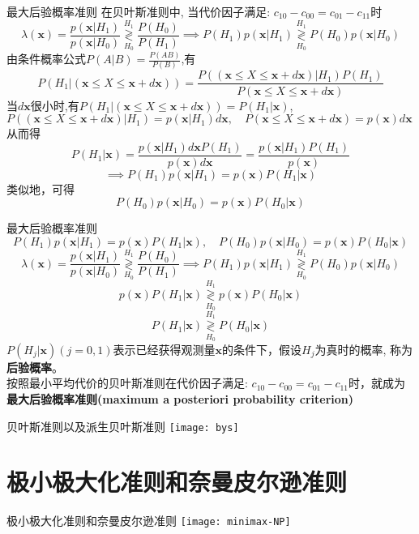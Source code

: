 \begin{frame}[shrink]{最大后验概率准则}
在贝叶斯准则中, 当代价因子满足: $c_{10}-c_{00}=c_{01}-c_{11}$时 
\[\lambda(\bm{x})=\frac{p(\bm{x}|H_1)}{p(\bm{x}|H_0)}\mathop{\gtrless}\limits_{H_0}^{H_1}\frac{P(H_0)}{P(H_1)}\implies P(H_1)p(\bm{x}|H_1)\mathop{\gtrless}\limits_{H_0}^{H_1}P(H_0)p(\bm{x}|H_0)\]
由条件概率公式$P(A|B)=\frac{P(AB)}{P(B)}$,有
\[P(H_1|(\bm{x}\le X\le \bm{x}+d\bm{x}))=\frac{P((\bm{x}\le X\le \bm{x}+d\bm{x})|H_1)P(H_1)}{P(\bm{x}\le X\le \bm{x}+d\bm{x})}\]
当$d\bm{x}$很小时,有$P(H_1|(\bm{x}\le X\le \bm{x}+d\bm{x}))=P(H_1|\bm{x})$, $P((\bm{x}\le X\le \bm{x}+d\bm{x})|H_1)=p(\bm{x}|H_1)d\bm{x},\quad P(\bm{x}\le X\le \bm{x}+d\bm{x})=p(\bm{x})d\bm{x}$\\
从而得
\[P(H_1|\bm{x})=\frac{p(\bm{x}|H_1)d\bm{x}P(H_1)}{p(\bm{x})d\bm{x}}=\frac{p(\bm{x}|H_1)P(H_1)}{p(\bm{x})}\]
\[\implies P(H_1)p(\bm{x}|H_1)=p(\bm{x})P(H_1|\bm{x}) \]
类似地，可得
\[P(H_0)p(\bm{x}|H_0)=p(\bm{x})P(H_0|\bm{x}) \]
\end{frame}

\begin{frame}[shrink]{最大后验概率准则}
\[P(H_1)p(\bm{x}|H_1)=p(\bm{x})P(H_1|\bm{x}),\quad P(H_0)p(\bm{x}|H_0)=p(\bm{x})P(H_0|\bm{x}) \]
\[\lambda(\bm{x})=\frac{p(\bm{x}|H_1)}{p(\bm{x}|H_0)}\mathop{\gtrless}\limits_{H_0}^{H_1}\frac{P(H_0)}{P(H_1)}\implies P(H_1)p(\bm{x}|H_1)\mathop{\gtrless}\limits_{H_0}^{H_1}P(H_0)p(\bm{x}|H_0)\]
\[p(\bm{x})P(H_1|\bm{x})\mathop{\gtrless}\limits_{H_0}^{H_1}p(\bm{x})P(H_0|\bm{x}) \]
\[P(H_1|\bm{x})\mathop{\gtrless}\limits_{H_0}^{H_1}P(H_0|\bm{x}) \]
$P(H_j|\bm{x})(j=0,1)$表示已经获得观测量$\bm{x}$的条件下，假设$H_j$为真时的概率, 称为\textbf{后验概率}。\\
按照最小平均代价的贝叶斯准则在代价因子满足: $c_{10}-c_{00}=c_{01}-c_{11}$时，就成为\textbf{最大后验概率准则(maximum a posteriori probability criterion)} 
\end{frame}

\begin{frame}[shrink]{贝叶斯准则以及派生贝叶斯准则}
\texttt{[image: bys]}
\end{frame}

\section{极小极大化准则和奈曼皮尔逊准则}

\begin{frame}[shrink]{极小极大化准则和奈曼皮尔逊准则}
\texttt{[image: minimax-NP]}
\end{frame}

